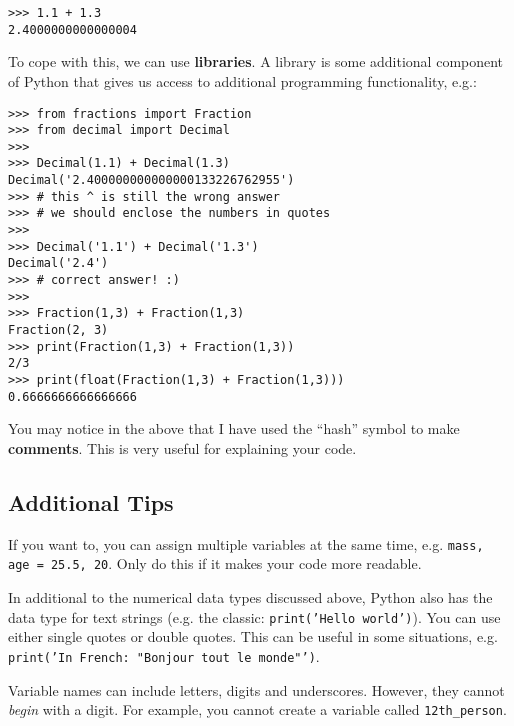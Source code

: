 \begin{multicols*}{2}
\vspace{-4mm}
\begin{verbatim}
>>> 1.1 + 1.3
2.4000000000000004
\end{verbatim}

To cope with this, we can use \textbf{libraries}. A library is some additional component of Python that gives us access to additional programming functionality, e.g.:

\vspace{-4mm}
\begin{verbatim}
>>> from fractions import Fraction
>>> from decimal import Decimal
>>>
>>> Decimal(1.1) + Decimal(1.3)
Decimal('2.400000000000000133226762955')
>>> # this ^ is still the wrong answer
>>> # we should enclose the numbers in quotes
>>> 
>>> Decimal('1.1') + Decimal('1.3')
Decimal('2.4')
>>> # correct answer! :)
>>>
>>> Fraction(1,3) + Fraction(1,3)
Fraction(2, 3)
>>> print(Fraction(1,3) + Fraction(1,3))
2/3
>>> print(float(Fraction(1,3) + Fraction(1,3)))
0.6666666666666666
\end{verbatim}

You may notice in the above that I have used the ``hash'' symbol to make \textbf{comments}. This is very useful for explaining your code.

\subsection{Additional Tips}
\begin{myitemize}
\item If you want to, you can assign multiple variables at the same time, e.g. \texttt{mass, age = 25.5, 20}. Only do this if it makes your code more readable.
\item In additional to the numerical data types discussed above, Python also has the data type for text strings (e.g. the classic: \texttt{print('Hello world')}). You can use either single quotes or double quotes. This can be useful in some situations, e.g.  \texttt{print('In French: "Bonjour tout le monde"')}.
\item Variable names can include letters, digits and underscores. However, they cannot \textit{begin} with a digit. For example, you cannot create a variable called  \texttt{12th_person}.
\end{myitemize}


\end{multicols*}